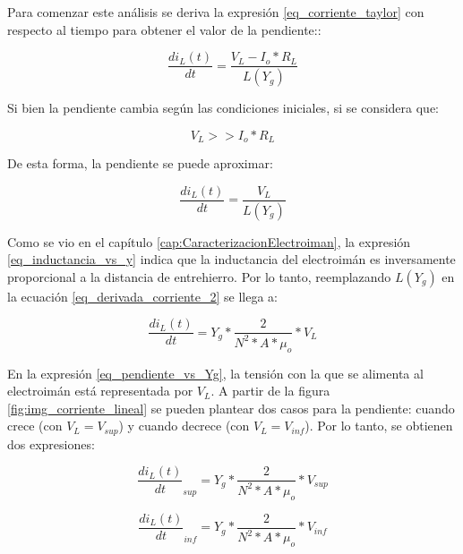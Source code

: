 Para comenzar este análisis se deriva la expresión \ref{eq_corriente_taylor} con respecto al tiempo para obtener el valor de la pendiente::


\begin{equation} \label{eq_derivada_corriente}
	\frac{di_L(t)}{dt}=\frac{V_L-I_o*R_L}{L(Y_g)}
\end{equation}

Si bien la pendiente cambia según las condiciones iniciales, si se considera que:

\begin{equation} \label{eq_Derivadadi-dt}
	V_{L}>>I_o*R_L
\end{equation}

De esta forma, la pendiente se puede aproximar:

\begin{equation} \label{eq_derivada_corriente_2}
	\frac{di_L(t)}{dt}= \frac{V_L}{L(Y_g)}
\end{equation}


Como se vio en el capítulo \ref{cap:CaracterizacionElectroiman}, la expresión \ref{eq_inductancia_vs_y} indica que la inductancia del electroimán es inversamente proporcional a la distancia de entrehierro. Por lo tanto, reemplazando $L(Y_g)$ en la ecuación \ref{eq_derivada_corriente_2} se llega a:

\begin{equation}\label{eq_pendiente_vs_Yg}
	\frac{di_L(t)}{dt}= Y_g*\frac{2}{N^2*A*\mu_o}*V_L
\end{equation}

En la expresión \ref{eq_pendiente_vs_Yg}, la tensión con la que se alimenta al electroimán está representada por $V_L$. A partir de la figura \ref{fig:img_corriente_lineal} se pueden plantear dos casos para la pendiente: cuando crece (con $V_L=V_{sup}$) y cuando decrece (con $V_L=V_{inf}$). Por lo tanto, se obtienen dos expresiones:

\begin{equation} 
	\frac{di_L(t)}{dt}_{sup}= Y_g*\frac{2}{N^2*A*\mu_o}*V_{sup}
\end{equation}


\begin{equation}
	\frac{di_L(t)}{dt}_{inf}= Y_g*\frac{2}{N^2*A*\mu_o}*V_{inf}
\end{equation}
%
%

